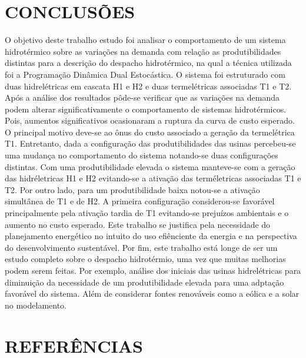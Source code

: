 \documentclass[12pt,fleqn]{article}
\begin{document}
\section{CONCLUS\~OES}
O objetivo deste trabalho estudo foi analisar o comportamento de um sistema hidrot\'ermico sobre as varia\c c\~oes na demanda com rela\c c\~ao as produtibilidades distintas para a descri\c c\~ao do despacho hidrot\'ermico, na  qual a t\'ecnica utilizada foi a Programa\c c\~ao Din\^amica Dual Estoc\'astica. O sistema foi
estruturado com duas hidrel\'etricas em cascata H1 e H2 e duas termel\'etricas associadas T1 e T2. Ap\'os a an\'alise dos resultados p\^ode-se verificar que as varia\c c\~oes na demanda podem alterar significativamente o comportamento de sistemas hidrot\'ermicos. Pois, aumentos significativos ocasionaram a ruptura da curva de custo esperado. O principal motivo deve-se ao \^onus do custo associado a gera\c c\~ao da termel\'etrica T1. Entretanto, dada a configura\c c\~ao das produtibilidades das usinas percebeu-se uma mudan\c ca no comportamento do sistema notando-se duas configura\c c\~oes distintas. Com uma produtibilidade elevada o sistema manteve-se com a
gera\c c\~ao das hidr\'eletricas H1 e H2 evitando-se a ativa\c c\~ao das term\'eletricas associadas T1 e T2. Por outro
lado, para um produtibilidade baixa notou-se a ativa\c c\~ao simult\^anea de T1 e de H2. A primeira configura\c c\~ao
considerou-se favor\'avel principalmente pela ativa\c c\~ao tardia de T1 evitando-se preju\'izos ambientais e o aumento
no custo esperado. Este trabalho se justifica pela necessidade do planejamento energ\'etico no intuito do uso
efi\^enciente da energia e na perspectiva do desenvolvimento sustent\'avel. Por fim, este trabalho est\'a longe de ser
um estudo completo sobre o despacho hidrot\'ermio, uma vez que muitas melhorias podem serem feitas. Por exemplo,
an\'alise dos  iniciais das usinas hidrel\'etricas para diminui\c c\~ao da necessidade de um produtibilidade elevada
para uma adpta\c c\~ao favor\'avel do sistema. Al\'em de considerar fontes renov\'aveis como a e\'olica e a solar no
modelamento.
\section*{REFER\^ENCIAS}
\end{document}

